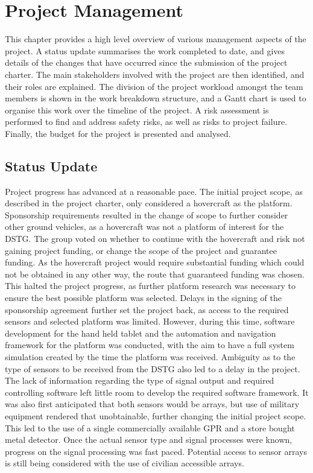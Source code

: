 \documentclass[main.tex]{subfiles}
\begin{document}
\chapter{Project Management}
This chapter provides a high level overview of various management aspects of the project. A status update summarises the work completed to date, and gives details of the changes that have occurred since the submission of the project charter. The main stakeholders involved with the project are then identified, and their roles are explained. The division of the project workload amongst the team members is shown in the work breakdown structure, and a Gantt chart is used to organise this work over the timeline of the project. A risk assessment is performed to find and address safety risks, as well as risks to project failure. Finally, the budget for the project is presented and analysed.  

\section{Status Update}
Project progress has advanced at a reasonable pace. The initial project scope, as described in the project charter, only considered a hovercraft as the platform. Sponsorship requirements resulted in the change of scope to further consider other ground vehicles, as a hovercraft was not a platform of interest for the DSTG. The group voted on whether to continue with the hovercraft and risk not gaining project funding, or change the scope of the project and guarantee funding. As the hovercraft project would require substantial funding which could not be obtained in any other way, the route that guaranteed funding was chosen. This halted the project progress, as further platform research was necessary to ensure the best possible platform was selected. Delays in the signing of the sponsorship agreement further set the project back, as access to the required sensors and selected platform was limited. However, during this time, software development for the hand held tablet and the automation and navigation framework for the platform was conducted, with the aim to have a full system simulation created by the time the platform was received. Ambiguity as to the type of sensors to be received from the DSTG also led to a delay in the project. The lack of information regarding the type of signal output and required controlling software left little room to develop the required software framework. It was also first anticipated that both sensors would be arrays, but use of military equipment rendered that unobtainable, further changing the initial project scope. This led to the use of a single commercially available GPR and a store bought metal detector. Once the actual sensor type and signal processes were known, progress on the signal processing was fast paced. Potential access to sensor arrays is still being considered with the use of civilian accessible arrays.      
\end{document}
